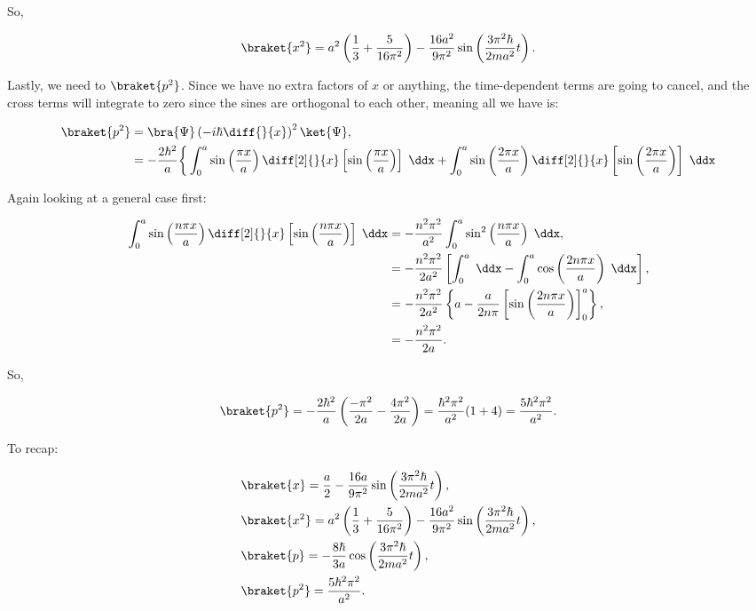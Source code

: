 So,

\begin{equation*}
    \braket{x^2} = a^2 \left( \frac{1}{3} + \frac{5}{16\pi^2} \right) -\frac{16a^2}{9\pi^2}\sin\left( \frac{3\pi^2\hbar}{2ma^2}t\right).
\end{equation*}

Lastly, we need to $\braket{p^2}$. Since we have no extra factors of $x$ or anything, the time-dependent terms are going to cancel, and the cross terms will integrate to zero since the sines are orthogonal to each other, meaning all we have is:

\begin{align*}
    \braket{p^2} &= \bra{\Psi} \left( -i\hbar \diff{}{x} \right)^2 \ket{\Psi}, \\
    &= -\frac{2\hbar^2}{a} \bigg\{\int_0^a \sin\left( \frac{\pi x}{a} \right)\diff[2]{}{x}\left[ \sin\left( \frac{\pi x}{a} \right) \right]\;\ddx + \int_0^a \sin\left( \frac{2\pi x}{a} \right)\diff[2]{}{x}\left[ \sin\left( \frac{2\pi x}{a} \right) \right]\;\ddx
\end{align*}

Again looking at a general case first:

\begin{align*}
    \int_0^a \sin\left( \frac{n\pi x}{a} \right)\diff[2]{}{x} \left[ \sin\left( \frac{n\pi x}{a} \right) \right]\;\ddx &= -\frac{n^2\pi^2}{a^2} \int_0^a \sin^2\left( \frac{n\pi x}{a} \right)\;\ddx, \\
    &= -\frac{n^2\pi^2}{2a^2} \left[ \int_0^a \;\ddx - \int_0^a \cos\left( \frac{2n\pi x}{a} \right)\;\ddx \right], \\
    &= - \frac{n^2\pi^2}{2a^2} \left\{ a - \frac{a}{2n\pi}\left[ \sin\left( \frac{2n\pi x}{a} \right) \right]_0^a \right\}, \\
    &= -\frac{n^2\pi^2}{2a}.
\end{align*}

So,

\begin{equation*}
    \braket{p^2} = -\frac{2\hbar^2}{a} \left(\frac{-\pi^2}{2a} - \frac{4\pi^2}{2a}\right) = \frac{\hbar^2\pi^2}{a^2}(1+4) = \frac{5\hbar^2\pi^2}{a^2}.
\end{equation*}

To recap:

\begin{align*}
    &\braket{x} = \frac{a}{2} - \frac{16a}{9\pi^2}\sin\left( \frac{3\pi^2\hbar}{2ma^2}t \right), \\
    &\braket{x^2} = a^2\left( \frac{1}{3} + \frac{5}{16\pi^2} \right) - \frac{16a^2}{9\pi^2} \sin\left( \frac{3\pi^2\hbar}{2ma^2}t \right), \\
    &\braket{p} = -\frac{8\hbar}{3a}\cos\left( \frac{3\pi^2\hbar}{2ma^2}t \right), \\
    &\braket{p^2} = \frac{5\hbar^2\pi^2}{a^2}.
\end{align*}

